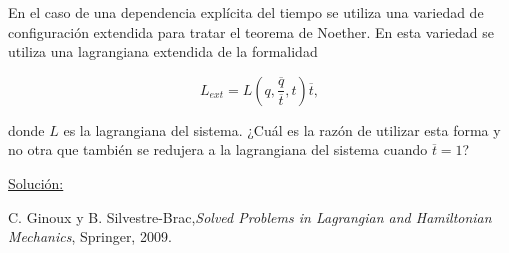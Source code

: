 \documentclass[a4paper,10pt]{article}
\numberwithin{equation}{section}
\begin{document}
En el caso de una dependencia explícita del tiempo se utiliza una variedad de configuración 
extendida para tratar el teorema de Noether. En esta variedad se utiliza una lagrangiana 
extendida de la formalidad

$$
L_{ext} = L(q,\frac{\overline{q}}{\overline{t}},t)\overline{t},
$$

donde $L$ es la lagrangiana del sistema. ¿Cuál es la razón de utilizar esta forma y no 
otra que también se redujera a la lagrangiana del sistema cuando $\overline{t}=1$?

\vspace{.3cm}

\underline{Solución:} \vspace{.3cm}

\begin{thebibliography}{20}
C. Ginoux y B. Silvestre-Brac,\emph{Solved Problems in Lagrangian and Hamiltonian Mechanics},
Springer, 2009.
\end{thebibliography}
\end{document}

